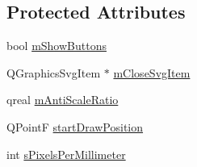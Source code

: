 \subsection*{Protected Attributes}
\begin{DoxyCompactItemize}
\item 
bool \hyperlink{class_u_b_abstract_draw_ruler_a46299ed6a2cf838fdfc9e5927a0b4d4b}{m\-Show\-Buttons}
\item 
Q\-Graphics\-Svg\-Item $\ast$ \hyperlink{class_u_b_abstract_draw_ruler_a72b3fd06a1ed5dd3facd96ba93639398}{m\-Close\-Svg\-Item}
\item 
qreal \hyperlink{class_u_b_abstract_draw_ruler_a92f48d4cf11861335075d27f297bdb44}{m\-Anti\-Scale\-Ratio}
\item 
Q\-Point\-F \hyperlink{class_u_b_abstract_draw_ruler_a70a96710815722c56698ba48197bf996}{start\-Draw\-Position}
\item 
int \hyperlink{class_u_b_abstract_draw_ruler_a55740bf0a8ca5f716c90287e721fbe89}{s\-Pixels\-Per\-Millimeter}
\end{DoxyCompactItemize}
